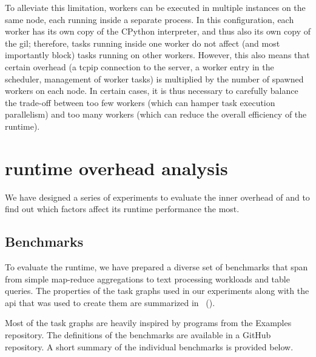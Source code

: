 To alleviate this limitation, \dask{} workers can be executed in multiple
instances on the same node, each running inside a separate process. In this configuration, each
worker has its own copy of the CPython interpreter, and thus also its own copy of the
\gls{gil}; therefore, tasks running inside one worker do not affect (and most
importantly block) tasks running on other workers. However, this also means that certain overhead
(a \gls{tcpip} connection to the server, a worker entry in the scheduler,
management of worker tasks) is multiplied by the number of spawned workers on each node. In certain
cases, it is thus necessary to carefully balance the trade-off between too few workers (which can
hamper task execution parallelism) and too many workers (which can reduce the overall efficiency of
the \dask{} runtime).

\section{\dask{} runtime overhead analysis}
\label{sec:rsds-dask-overhead-analysis}
We have designed a series of experiments to evaluate the inner overhead of
\dask{} and to find out which factors affect its runtime performance the most.

\subsection{Benchmarks}
To evaluate the runtime, we have prepared a diverse set of benchmarks that span from simple
map-reduce aggregations to text processing workloads and table queries. The properties of the task
graphs used in our experiments along with the \dask{}
\gls{api} that was used to create them are summarized
in~ ().

Most of the task graphs are heavily inspired by programs from the \dask{}
Examples repository. The definitions of the benchmarks are available in
a GitHub repository. A short summary of the individual benchmarks is
provided below.

